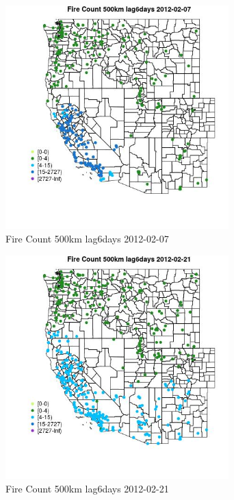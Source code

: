 \begin{figure} 
\centering  
\includegraphics[width=0.77\textwidth]{Code_Outputs/Report_ML_input_PM25_Step4_part_f_de_duplicated_aveswNAs_MapObsFire_Count_500km_lag6days2012-02-07.jpg} 
\caption{\label{fig:Report_ML_input_PM25_Step4_part_f_de_duplicated_aveswNAsMapObsFire_Count_500km_lag6days2012-02-07}Fire Count 500km lag6days 2012-02-07} 
\end{figure} 
 

\clearpage 

\begin{figure} 
\centering  
\includegraphics[width=0.77\textwidth]{Code_Outputs/Report_ML_input_PM25_Step4_part_f_de_duplicated_aveswNAs_MapObsFire_Count_500km_lag6days2012-02-21.jpg} 
\caption{\label{fig:Report_ML_input_PM25_Step4_part_f_de_duplicated_aveswNAsMapObsFire_Count_500km_lag6days2012-02-21}Fire Count 500km lag6days 2012-02-21} 
\end{figure} 
 


